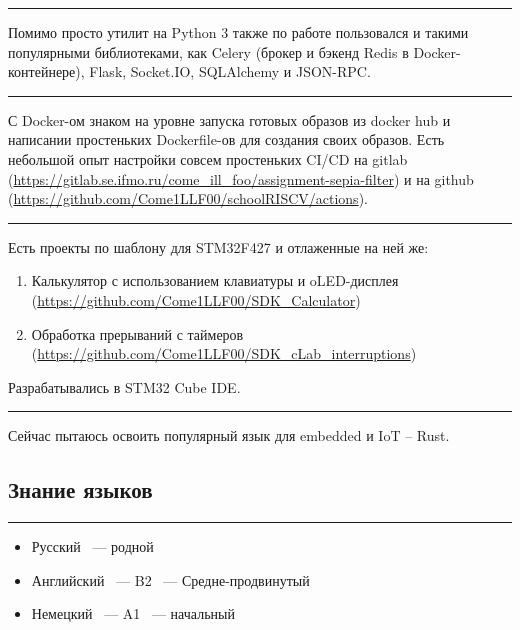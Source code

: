 \documentclass[10pt, final, twoside]{article}
\begin{document}
\par\noindent\rule{\textwidth}{0.1pt}

Помимо просто утилит на Python 3 также по работе пользовался и такими популярными библиотеками, как Celery (брокер и бэкенд Redis в Docker-контейнере), Flask, Socket.IO, SQLAlchemy и JSON-RPC.

\par\noindent\rule{\textwidth}{0.1pt}

С Docker-ом знаком на уровне запуска готовых образов из docker hub и написании простеньких Dockerfile-ов для создания своих образов. Есть небольшой опыт настройки совсем простеньких CI/CD на gitlab (\url{https://gitlab.se.ifmo.ru/come_ill_foo/assignment-sepia-filter}) и на github (\url{https://github.com/Come1LLF00/schoolRISCV/actions}).

\par\noindent\rule{\textwidth}{0.1pt}

Есть проекты по шаблону для STM32F427 и отлаженные на ней же:
\begin{enumerate}
  \item Калькулятор с использованием клавиатуры и oLED-дисплея (\url{https://github.com/Come1LLF00/SDK_Calculator})
  \item Обработка прерываний с таймеров (\url{https://github.com/Come1LLF00/SDK_cLab_interruptions})
\end{enumerate}
Разрабатывались в STM32 Cube IDE.

\par\noindent\rule{\textwidth}{0.1pt}

Сейчас пытаюсь освоить популярный язык для embedded и IoT -- Rust.
  
  \subsection*{\textcolor{darkgray2}{Знание языков}}
  \vspace*{-5.5mm}
  \par\noindent\rule{\textwidth}{0.1pt}
  \begin{itemize}
    \item Русский ~--- родной
    \item Английский ~--- B2 ~--- Средне-продвинутый
    \item Немецкий ~--- A1 ~--- начальный
  \end{itemize}
\end{document}
